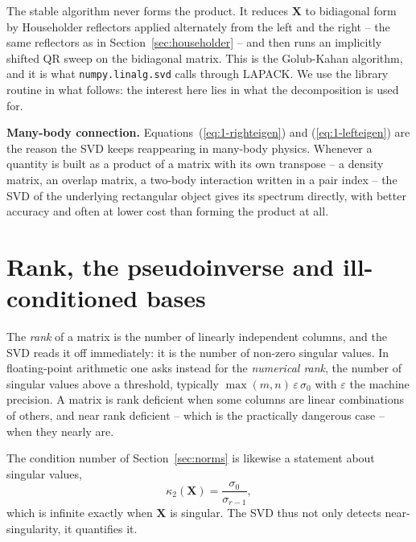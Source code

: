 The stable algorithm never forms the product.  It reduces $\bm{X}$ to
bidiagonal form by Householder reflectors applied alternately from the left
and the right -- the same reflectors as in Section~\ref{sec:householder} --
and then runs an implicitly shifted QR sweep on the bidiagonal matrix.  This
is the Golub-Kahan algorithm, and it is what \texttt{numpy.linalg.svd} calls
through LAPACK.  We use the library routine in what follows: the interest
here lies in what the decomposition is used for.

\begin{notebox}
\textbf{Many-body connection.} Equations~(\ref{eq:1-righteigen}) and
(\ref{eq:1-lefteigen}) are the reason the SVD keeps reappearing in many-body
physics.  Whenever a quantity is built as a product of a matrix with its own
transpose -- a density matrix, an overlap matrix, a two-body interaction
written in a pair index -- the SVD of the underlying rectangular object gives
its spectrum directly, with better accuracy and often at lower cost than
forming the product at all.
\end{notebox}

\section{Rank, the pseudoinverse and ill-conditioned bases}
\label{sec:pseudoinverse}

The \emph{rank} of a matrix is the number of linearly independent columns, and
the SVD reads it off immediately: it is the number of non-zero singular
values.  In floating-point arithmetic one asks instead for the
\emph{numerical rank}, the number of singular values above a threshold,
typically $\max(m,n)\,\varepsilon\,\sigma_0$ with $\varepsilon$ the machine
precision.  A matrix is rank deficient when some columns are linear
combinations of others, and near rank deficient -- which is the practically
dangerous case -- when they nearly are.

The condition number of Section~\ref{sec:norms} is likewise a statement about
singular values,
\begin{equation}
  \kappa_2(\bm{X}) = \frac{\sigma_0}{\sigma_{r-1}} ,
  \label{eq:1-svdcond}
\end{equation}
which is infinite exactly when $\bm{X}$ is singular.  The SVD thus not only
detects near-singularity, it quantifies it.


